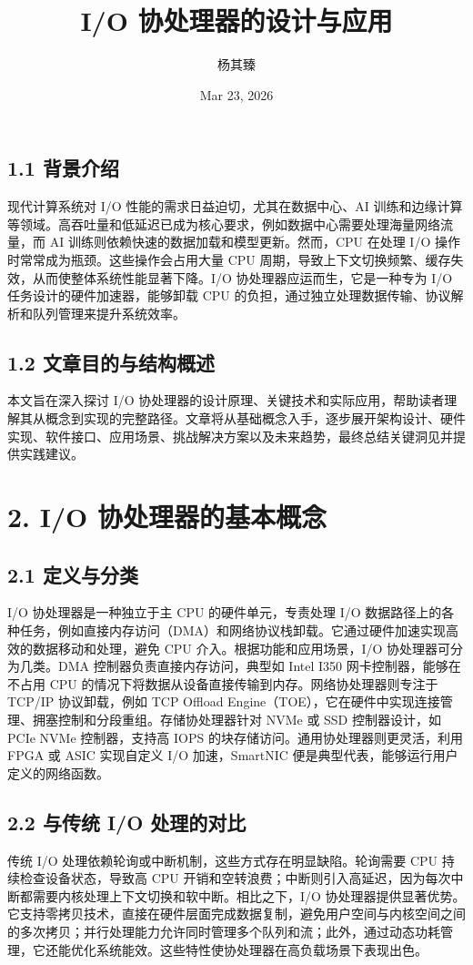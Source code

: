 \title{I/O 协处理器的设计与应用}
\author{杨其臻}
\date{Mar 23, 2026}
\maketitle
\section{1.1 背景介绍}
现代计算系统对 I/O 性能的需求日益迫切，尤其在数据中心、AI 训练和边缘计算等领域。高吞吐量和低延迟已成为核心要求，例如数据中心需要处理海量网络流量，而 AI 训练则依赖快速的数据加载和模型更新。然而，CPU 在处理 I/O 操作时常常成为瓶颈。这些操作会占用大量 CPU 周期，导致上下文切换频繁、缓存失效，从而使整体系统性能显著下降。I/O 协处理器应运而生，它是一种专为 I/O 任务设计的硬件加速器，能够卸载 CPU 的负担，通过独立处理数据传输、协议解析和队列管理来提升系统效率。\par
\section{1.2 文章目的与结构概述}
本文旨在深入探讨 I/O 协处理器的设计原理、关键技术和实际应用，帮助读者理解其从概念到实现的完整路径。文章将从基础概念入手，逐步展开架构设计、硬件实现、软件接口、应用场景、挑战解决方案以及未来趋势，最终总结关键洞见并提供实践建议。\par
\chapter{2. I/O 协处理器的基本概念}
\section{2.1 定义与分类}
I/O 协处理器是一种独立于主 CPU 的硬件单元，专责处理 I/O 数据路径上的各种任务，例如直接内存访问（DMA）和网络协议栈卸载。它通过硬件加速实现高效的数据移动和处理，避免 CPU 介入。根据功能和应用场景，I/O 协处理器可分为几类。DMA 控制器负责直接内存访问，典型如 Intel I350 网卡控制器，能够在不占用 CPU 的情况下将数据从设备直接传输到内存。网络协处理器则专注于 TCP/IP 协议卸载，例如 TCP Offload Engine（TOE），它在硬件中实现连接管理、拥塞控制和分段重组。存储协处理器针对 NVMe 或 SSD 控制器设计，如 PCIe NVMe 控制器，支持高 IOPS 的块存储访问。通用协处理器则更灵活，利用 FPGA 或 ASIC 实现自定义 I/O 加速，SmartNIC 便是典型代表，能够运行用户定义的网络函数。\par
\section{2.2 与传统 I/O 处理的对比}
传统 I/O 处理依赖轮询或中断机制，这些方式存在明显缺陷。轮询需要 CPU 持续检查设备状态，导致高 CPU 开销和空转浪费；中断则引入高延迟，因为每次中断都需要内核处理上下文切换和软中断。相比之下，I/O 协处理器提供显著优势。它支持零拷贝技术，直接在硬件层面完成数据复制，避免用户空间与内核空间之间的多次拷贝；并行处理能力允许同时管理多个队列和流；此外，通过动态功耗管理，它还能优化系统能效。这些特性使协处理器在高负载场景下表现出色。\par
